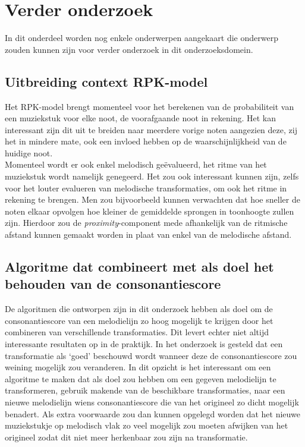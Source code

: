 \section{Verder onderzoek}
In dit onderdeel worden nog enkele onderwerpen aangekaart die onderwerp zouden kunnen zijn voor verder onderzoek in dit onderzoeksdomein.

\subsection{Uitbreiding context RPK-model}
Het RPK-model brengt momenteel voor het berekenen van de probabiliteit van een muziekstuk voor elke noot, de voorafgaande noot in rekening. Het kan interessant zijn dit uit te breiden naar meerdere vorige noten aangezien deze, zij het in mindere mate, ook een invloed hebben op de waarschijnlijkheid van de huidige noot.\\
Momenteel wordt er ook enkel melodisch ge\"evalueerd, het ritme van het muziekstuk wordt namelijk genegeerd. Het zou ook interessant kunnen zijn, zelfs voor het louter evalueren van melodische transformaties, om ook het ritme in rekening te brengen. Men zou bijvoorbeeld kunnen verwachten dat hoe sneller de noten elkaar opvolgen hoe kleiner de gemiddelde sprongen in toonhoogte zullen zijn. Hierdoor zou de \textit{proximity}-component mede afhankelijk van de ritmische afstand kunnen gemaakt worden in plaat van enkel van de melodische afstand.

\subsection{Algoritme dat combineert met als doel het behouden van de consonantiescore}
De algoritmen die ontworpen zijn in dit onderzoek hebben als doel om de consonantiescore van een melodielijn zo hoog mogelijk te krijgen door het combineren van verschillende transformaties. Dit levert echter niet altijd interessante resultaten op in de praktijk. In het onderzoek is gesteld dat een transformatie als `goed' beschouwd wordt wanneer deze de consonantiescore zou weining mogelijk zou veranderen. In dit opzicht is het interessant om een algoritme te maken dat als doel zou hebben om een gegeven melodielijn te transformeren, gebruik makende van de beschikbare transformaties, naar een nieuwe melodielijn wiens consonantiescore die van het origineel zo dicht mogelijk benadert. Als extra voorwaarde zou dan kunnen opgelegd worden dat het nieuwe muziekstukje op melodisch vlak zo veel mogelijk zou moeten afwijken van het origineel zodat dit niet meer herkenbaar zou zijn na transformatie.

